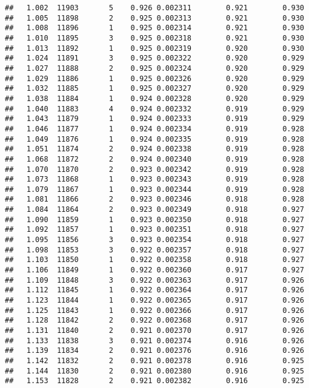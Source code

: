 \documentclass[
]{book}
\begin{document}
\begin{verbatim}
##   1.002  11903       5    0.926 0.002311        0.921        0.930
##   1.005  11898       2    0.925 0.002313        0.921        0.930
##   1.008  11896       1    0.925 0.002314        0.921        0.930
##   1.010  11895       3    0.925 0.002318        0.921        0.930
##   1.013  11892       1    0.925 0.002319        0.920        0.930
##   1.024  11891       3    0.925 0.002322        0.920        0.929
##   1.027  11888       2    0.925 0.002324        0.920        0.929
##   1.029  11886       1    0.925 0.002326        0.920        0.929
##   1.032  11885       1    0.925 0.002327        0.920        0.929
##   1.038  11884       1    0.924 0.002328        0.920        0.929
##   1.040  11883       4    0.924 0.002332        0.919        0.929
##   1.043  11879       1    0.924 0.002333        0.919        0.929
##   1.046  11877       1    0.924 0.002334        0.919        0.928
##   1.049  11876       1    0.924 0.002335        0.919        0.928
##   1.051  11874       2    0.924 0.002338        0.919        0.928
##   1.068  11872       2    0.924 0.002340        0.919        0.928
##   1.070  11870       2    0.923 0.002342        0.919        0.928
##   1.073  11868       1    0.923 0.002343        0.919        0.928
##   1.079  11867       1    0.923 0.002344        0.919        0.928
##   1.081  11866       2    0.923 0.002346        0.918        0.928
##   1.084  11864       2    0.923 0.002349        0.918        0.927
##   1.090  11859       1    0.923 0.002350        0.918        0.927
##   1.092  11857       1    0.923 0.002351        0.918        0.927
##   1.095  11856       3    0.923 0.002354        0.918        0.927
##   1.098  11853       3    0.922 0.002357        0.918        0.927
##   1.103  11850       1    0.922 0.002358        0.918        0.927
##   1.106  11849       1    0.922 0.002360        0.917        0.927
##   1.109  11848       3    0.922 0.002363        0.917        0.926
##   1.112  11845       1    0.922 0.002364        0.917        0.926
##   1.123  11844       1    0.922 0.002365        0.917        0.926
##   1.125  11843       1    0.922 0.002366        0.917        0.926
##   1.128  11842       2    0.922 0.002368        0.917        0.926
##   1.131  11840       2    0.921 0.002370        0.917        0.926
##   1.133  11838       3    0.921 0.002374        0.916        0.926
##   1.139  11834       2    0.921 0.002376        0.916        0.926
##   1.142  11832       2    0.921 0.002378        0.916        0.925
##   1.144  11830       2    0.921 0.002380        0.916        0.925
##   1.153  11828       2    0.921 0.002382        0.916        0.925

\end{verbatim}
\end{document}
